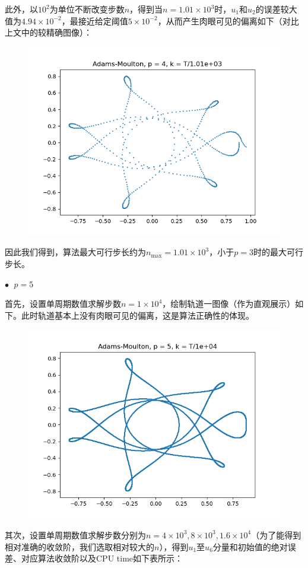 \documentclass{ctexart}
\begin{document}
\begin{sloppypar}
此外，以$10^2$为单位不断改变步数$n$，得到当$n = 1.01 \times 10^3$时，$u_1$和$u_2$的误差较大值为$4.94 \times 10^{-2}$，最接近给定阈值$5 \times 10^{-2}$，从而产生肉眼可见的偏离如下（对比上文中的较精确图像）：
\begin{figure}[H]
\centering
\includegraphics[scale = 0.45]{./report_src/Figure_53.png}
\end{figure}
因此我们得到，算法最大可行步长约为$n_{\max} = 1.01 \times 10^3$，小于$p=3$时的最大可行步长。

$\bullet \;$ $p = 5$

首先，设置单周期数值求解步数$n = 1 \times 10^4$，绘制轨道一图像（作为直观展示）如下。此时轨道基本上没有肉眼可见的偏离，这是算法正确性的体现。
\begin{figure}[H]
\centering
\includegraphics[scale = 0.45]{./report_src/Figure_54.png}
\end{figure}
其次，设置单周期数值求解步数分别为$n = 4 \times 10^3,8 \times 10^3,1.6 \times 10^4$（为了能得到相对准确的收敛阶，我们选取相对较大的$n$），得到$u_1$至$u_6$分量和初始值的绝对误差、对应算法收敛阶以及CPU time如下表所示：


\end{sloppypar}
\end{document}
